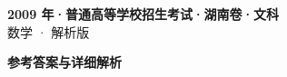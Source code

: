 \documentclass[zihao=-4, a4paper]{ctexart}
\begin{document}
\begin{center}
  {\Large\bfseries 2009 年·普通高等学校招生考试·湖南卷·文科}\\[4pt]
  {\large 数学 · 解析版}
\end{center}
\medskip
{}

\clearpage
{}
\begin{center}{\Large\bfseries 参考答案与详细解析}\end{center}
\medskip

\end{document}
